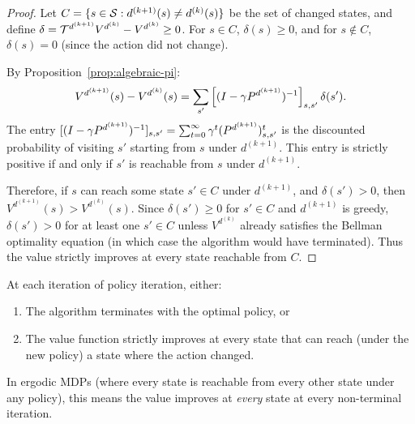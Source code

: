 \documentclass[11pt,a4paper]{article}
\begin{document}
\begin{proof}
Let $C = \{s \in \mathcal{S} : d^{(k+1)}(s) \neq d^{(k)}(s)\}$
be the set of changed states, and define
$\delta = \mathcal{T}^{d^{(k+1)}} V^{d^{(k)}} - V^{d^{(k)}} \geq 0$.
For $s \in C$, $\delta(s) \geq 0$, and for $s \notin C$,
$\delta(s) = 0$ (since the action did not change).

By Proposition~\ref{prop:algebraic-pi}:
\[
    V^{d^{(k+1)}}(s) - V^{d^{(k)}}(s) =
    \sum_{s'} \left[(I - \gamma P^{d^{(k+1)}})^{-1}\right]_{s,s'}
    \delta(s').
\]
The entry $[(I - \gamma P^{d^{(k+1)}})^{-1}]_{s,s'}
= \sum_{t=0}^\infty \gamma^t (P^{d^{(k+1)}})^t_{s,s'}$ is the
discounted probability of visiting $s'$ starting from $s$ under
$d^{(k+1)}$. This entry is strictly positive if and only if $s'$
is reachable from $s$ under $d^{(k+1)}$.

Therefore, if $s$ can reach some state $s' \in C$ under $d^{(k+1)}$,
and $\delta(s') > 0$, then $V^{d^{(k+1)}}(s) > V^{d^{(k)}}(s)$.
Since $\delta(s') \geq 0$ for $s' \in C$ and $d^{(k+1)}$ is greedy,
$\delta(s') > 0$ for at least one $s' \in C$ unless $V^{d^{(k)}}$
already satisfies the Bellman optimality equation (in which case the
algorithm would have terminated). Thus the value strictly improves at
every state reachable from $C$.
\end{proof}

\begin{keyresult}[title={Howard's Improvement Principle}]
At each iteration of policy iteration, either:
\begin{enumerate}[nosep]
    \item The algorithm terminates with the optimal policy, or
    \item The value function strictly improves at every state that
    can reach (under the new policy) a state where the action
    changed.
\end{enumerate}
In ergodic MDPs (where every state is reachable from every other
state under any policy), this means the value improves at
\emph{every} state at every non-terminal iteration.
\end{keyresult}
\end{document}
